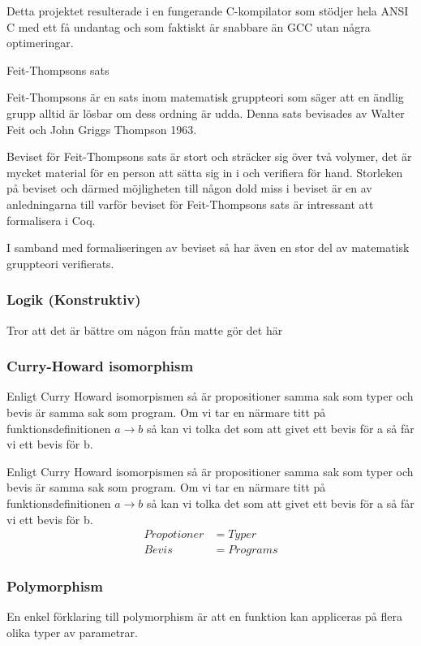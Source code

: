 Detta projektet resulterade i en fungerande C-kompilator som stödjer hela ANSI
C med ett få undantag och som faktiskt är snabbare än GCC utan några
optimeringar.

{\underline \large Feit-Thompsons sats}

Feit-Thompsons är en sats inom matematisk gruppteori som säger att en ändlig
grupp alltid är lösbar om dess ordning är udda\cite{aschbacher2004status}.
Denna sats bevisades av Walter Feit och John Griggs Thompson 1963.

Beviset för Feit-Thompsons sats är stort och sträcker sig över två volymer, det
är mycket material för en person att sätta sig in i och verifiera för hand.
Storleken på beviset och därmed möjligheten till någon dold miss i beviset är
en av anledningarna till varför beviset för Feit-Thompsons sats är intressant
att formalisera i Coq.

I samband med formaliseringen av beviset så har även en stor del av matematisk
gruppteori verifierats.

\subsubsection{Logik (Konstruktiv)}
Tror att det är bättre om någon från matte gör det här

\subsubsection{Curry-Howard isomorphism}
Enligt Curry Howard isomorpismen så är propositioner samma sak som typer och
bevis är samma sak som program. Om vi tar en närmare titt på
funktionsdefinitionen $a \rightarrow b$ så kan vi tolka det som att givet ett
bevis för a så får vi ett bevis för b.

Enligt Curry Howard isomorpismen så är propositioner samma sak som typer och
bevis är samma sak som program. Om vi tar en närmare titt på
funktionsdefinitionen $a \rightarrow b$ så kan vi tolka det som att givet ett
bevis för a så får vi ett bevis för b.
\begin{align*}
Propotioner &= Typer \\
Bevis &= Programs
\end{align*}

\subsubsection{Polymorphism}
En enkel förklaring till polymorphism är att en funktion kan appliceras på
flera olika typer av parametrar.

